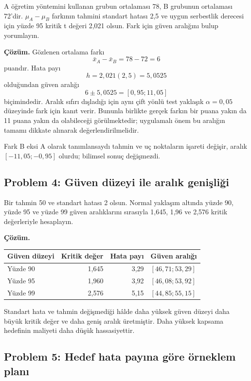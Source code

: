A öğretim yöntemini kullanan grubun ortalaması 78, B grubunun ortalaması
72'dir. $\mu_A-\mu_B$ farkının tahmini standart hatası 2,5 ve uygun serbestlik
derecesi için yüzde 95 kritik t değeri 2,021 olsun. Fark için güven aralığını
bulup yorumlayın.

\textbf{Çözüm.} Gözlenen ortalama farkı
\[
\bar x_A-\bar x_B=78-72=6
\]
puandır. Hata payı
\[
h=2{,}021(2{,}5)=5{,}0525
\]
olduğundan güven aralığı
\[
6\pm5{,}0525=[0{,}95;11{,}05]
\]
biçimindedir. Aralık sıfırı dışladığı için aynı çift yönlü test yaklaşık
$\alpha=0{,}05$ düzeyinde fark için kanıt verir. Bununla birlikte gerçek
farkın bir puana yakın da 11 puana yakın da olabileceği görülmektedir;
uygulamalı önem bu aralığın tamamı dikkate alınarak değerlendirilmelidir.

Fark B eksi A olarak tanımlansaydı tahmin ve uç noktaların işareti değişir,
aralık $[-11{,}05;-0{,}95]$ olurdu; bilimsel sonuç değişmezdi.

\subsection*{Problem 4: Güven düzeyi ile aralık genişliği}

Bir tahmin 50 ve standart hatası 2 olsun. Normal yaklaşım altında yüzde 90,
yüzde 95 ve yüzde 99 güven aralıklarını sırasıyla 1,645, 1,96 ve 2,576 kritik
değerleriyle hesaplayın.

\textbf{Çözüm.}

\begin{center}
\small
\begin{tabular}{lrrl}
\toprule
Güven düzeyi & Kritik değer & Hata payı & Güven aralığı \\
\midrule
Yüzde 90 & 1,645 & 3,29 & $[46{,}71;53{,}29]$ \\
Yüzde 95 & 1,960 & 3,92 & $[46{,}08;53{,}92]$ \\
Yüzde 99 & 2,576 & 5,15 & $[44{,}85;55{,}15]$ \\
\bottomrule
\end{tabular}
\end{center}

Standart hata ve tahmin değişmediği hâlde daha yüksek güven düzeyi daha büyük
kritik değer ve daha geniş aralık üretmiştir. Daha yüksek kapsama hedefinin
maliyeti daha düşük hassasiyettir.

\subsection*{Problem 5: Hedef hata payına göre örneklem planı}

